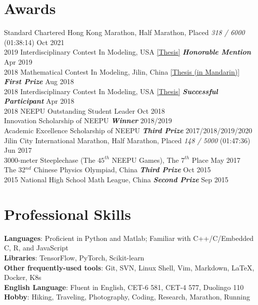 \documentclass{my_cv}
\begin{document}
\section{Awards}

 Standard Chartered Hong Kong Marathon, Half Marathon, Placed \emph{318 / 6000} (01:38:14) \hfill Oct 2021 \\
2019 Interdisciplinary Contest In Modeling, USA \href{https://shuyuej.com/files/ICM-2019.pdf}{[Thesis]}  \textbf{\emph{Honorable Mention}} \hfill Apr 2019 \\
2018 Mathematical Contest In Modeling, Jilin, China \href{https://shuyuej.com/files/MCM-2018.pdf}{[Thesis (in Mandarin)]}  \textbf{\emph{First Prize}} \hfill Aug 2018 \\
2018 Interdisciplinary Contest In Modeling, USA \href{https://shuyuej.com/files/ICM-2018.pdf}{[Thesis]}  \textbf{\emph{Successful Participant}} \hfill Apr 2018 \\
2018 NEEPU Outstanding Student Leader \hfill Oct 2018 \\
Innovation Scholarship of NEEPU  \textbf{\emph{Winner}} \hfill 2018/2019 \\
Academic Excellence Scholarship of NEEPU  \textbf{\emph{Third Prize}} \hfill 2017/2018/2019/2020 \\
Jilin City International Marathon, Half Marathon, Placed \emph{148 / 5000} (01:47:36) \hfill Jun 2017 \\
3000-meter Steeplechase (The $45^{th}$ NEEPU Games), The $7^{th}$ Place \hfill May 2017 \\
The 32$^{nd}$ Chinese Physics Olympiad, China  \textbf{\emph{Third Prize}} \hfill Oct 2015 \\
2015 National High School Math League, China  \textbf{\emph{Second Prize}} \hfill Sep 2015

\hspace*{\fill}

\section{Professional Skills}

\noindent \textbf{Languages}: Proficient in Python and Matlab; Familiar with C++/C/Embedded C, R, and JavaScript \\
\textbf{Libraries}: TensorFlow, PyTorch, Scikit-learn \\
\textbf{Other frequently-used tools}: Git, SVN, Linux Shell, Vim, Markdown, \LaTeX, Docker, K8s \\
\textbf{English Language}: Fluent in English, CET-6 581, CET-4 577, Duolingo 110 \\
\textbf{Hobby}: Hiking, Traveling, Photography, Coding, Research, Marathon, Running
\end{document}
